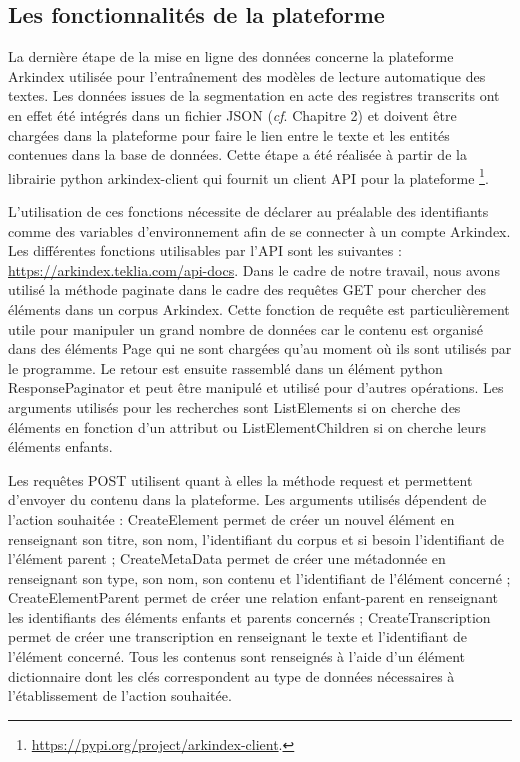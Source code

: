\documentclass[a4paper,12pt,twoside]{book}
\begin{document}
	\subsection{Les fonctionnalités de la plateforme}
	
	La dernière étape de la mise en ligne des données concerne la plateforme Arkindex utilisée pour l'entraînement des modèles de lecture automatique des textes. Les données issues de la segmentation en acte des registres transcrits ont en effet été intégrés dans un fichier JSON (\textit{cf}. Chapitre 2) et doivent être chargées dans la plateforme pour faire le lien entre le texte et les entités contenues dans la base de données. Cette étape a été réalisée à partir de la librairie python arkindex-client qui fournit un client API pour la plateforme \footnote{\url{https://pypi.org/project/arkindex-client}.}.
	
	L'utilisation de ces fonctions nécessite de déclarer au préalable des identifiants comme des variables d'environnement afin de se connecter à un compte Arkindex. Les différentes fonctions utilisables par l'API sont les suivantes : \url{https://arkindex.teklia.com/api-docs}. Dans le cadre de notre travail, nous avons utilisé la méthode \og paginate\fg{} dans le cadre des requêtes GET pour chercher des éléments dans un corpus Arkindex. Cette fonction de requête est particulièrement utile pour manipuler un grand nombre de données car le contenu est organisé dans des éléments \og Page\fg{} qui ne sont chargées qu'au moment où ils sont utilisés par le programme. Le retour est ensuite rassemblé dans un élément python ResponsePaginator et peut être manipulé et utilisé pour d'autres opérations. Les arguments utilisés pour les recherches sont \og ListElements \fg{} si on cherche des éléments en fonction d'un attribut ou \og ListElementChildren \fg{} si on cherche leurs éléments enfants.
	
	Les requêtes POST utilisent quant à elles la méthode \og request\fg{} et permettent d'envoyer du contenu dans la plateforme. Les arguments utilisés dépendent de l'action souhaitée : \og CreateElement\fg{} permet de créer un nouvel élément en renseignant son titre, son nom, l'identifiant du corpus et si besoin l'identifiant de l'élément parent ; \og CreateMetaData\fg{} permet de créer une métadonnée en renseignant son type, son nom, son contenu et l'identifiant de l'élément concerné ; \og CreateElementParent\fg{} permet de créer une relation enfant-parent en renseignant les identifiants des éléments enfants et parents concernés ; \og CreateTranscription\fg{} permet de créer une transcription en renseignant le texte et l'identifiant de l'élément concerné. Tous les contenus sont renseignés à l'aide d'un élément dictionnaire dont les clés correspondent au type de données nécessaires à l'établissement de l'action souhaitée.
	
\end{document}
